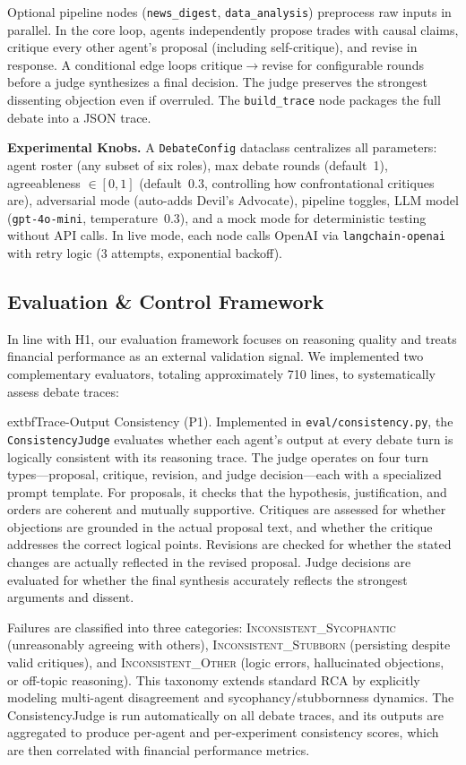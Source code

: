 \documentclass{article}
\begin{document}
Optional pipeline nodes (\texttt{news\_digest}, \texttt{data\_analysis}) preprocess raw inputs in parallel. In the core loop, agents independently propose trades with causal claims, critique every other agent's proposal (including self-critique), and revise in response. A conditional edge loops critique$\to$revise for configurable rounds before a judge synthesizes a final decision. The judge preserves the strongest dissenting objection even if overruled. The \texttt{build\_trace} node packages the full debate into a JSON trace.

\textbf{Experimental Knobs.}
A \texttt{DebateConfig} dataclass centralizes all parameters: agent roster (any subset of six roles), max debate rounds (default~1), agreeableness $\in [0,1]$ (default~0.3, controlling how confrontational critiques are), adversarial mode (auto-adds Devil's Advocate), pipeline toggles, LLM model (\texttt{gpt-4o-mini}, temperature~0.3), and a mock mode for deterministic testing without API calls. In live mode, each node calls OpenAI via \texttt{langchain-openai} with retry logic (3 attempts, exponential backoff).

\subsection{Evaluation \& Control Framework}

In line with H1, our evaluation framework focuses on reasoning quality and treats financial performance as an external validation signal. We implemented two complementary evaluators, totaling approximately 710 lines, to systematically assess debate traces:

	extbf{Trace-Output Consistency (P1).}
Implemented in \texttt{eval/consistency.py}, the \texttt{ConsistencyJudge} evaluates whether each agent's output at every debate turn is logically consistent with its reasoning trace. The judge operates on four turn types---proposal, critique, revision, and judge decision---each with a specialized prompt template. For proposals, it checks that the hypothesis, justification, and orders are coherent and mutually supportive. Critiques are assessed for whether objections are grounded in the actual proposal text, and whether the critique addresses the correct logical points. Revisions are checked for whether the stated changes are actually reflected in the revised proposal. Judge decisions are evaluated for whether the final synthesis accurately reflects the strongest arguments and dissent.

Failures are classified into three categories: \textsc{Inconsistent\_Sycophantic} (unreasonably agreeing with others), \textsc{Inconsistent\_Stubborn} (persisting despite valid critiques), and \textsc{Inconsistent\_Other} (logic errors, hallucinated objections, or off-topic reasoning). This taxonomy extends standard RCA by explicitly modeling multi-agent disagreement and sycophancy/stubbornness dynamics. The ConsistencyJudge is run automatically on all debate traces, and its outputs are aggregated to produce per-agent and per-experiment consistency scores, which are then correlated with financial performance metrics.
\end{document}

